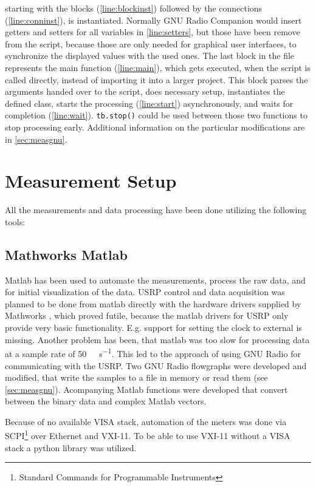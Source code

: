\documentclass[12pt,a4paper,parskip=full]{scrartcl}
\begin{document}
starting with the blocks (\cref{line:blockinst}) followed by the connections
(\cref{line:conninst}), is instantiated. Normally GNU Radio Companion would insert
getters and setters for all variables in \cref{line:setters}, but those have been
remove from the script, because those are only needed for graphical user interfaces,
to synchronize the displayed values with the used ones. The last block in the file
represents the main function (\cref{line:main}), which gets executed, when the script
is called directly, instead of importing it into a larger project. This block parses
the arguments handed over to the script, does necessary setup, instantiates
the defined class, starts the processing (\cref{line:start}) asynchronously, and waits for completion
(\cref{line:wait}). \lstinline{tb.stop()} could be used between those two functions to
stop processing early. Additional information on the particular modifications are in
\cref{sec:measgnu}.
\section{Measurement Setup}
All the measurements and data processing have been done utilizing the following tools:
\subsection{Mathworks Matlab}
Matlab has been used to automate the measurements, process the raw data, and for
initial visualization of the data. USRP control and data acquisition was planned to
be done from matlab directly with the hardware drivers supplied by Mathworks \cite{matlab_usrp},
which proved futile, because the matlab drivers for
USRP only provide very basic functionality. E.g. support for setting the clock to
external is missing. Another problem has been, that matlab was too slow for processing
data at a sample rate of \SI{50}{\mega\samples\per\second}. This led to the approach of
using GNU Radio for communicating with the USRP. Two GNU Radio flowgraphs were
developed and modified, that write the samples to a file in memory or read them
(see \cref{sec:measgnu}). Acompanying Matlab functions were developed that convert
between the binary data and complex Matlab vectors.

Because of no available VISA stack, automation of the meters was done via
SCPI\footnote{Standard Commands for Programmable Instruments} over Ethernet and VXI-11.
To be able to use VXI-11 without a VISA stack a python library \cite{yamamoto_vxi-11} was
utilized.
\end{document}
